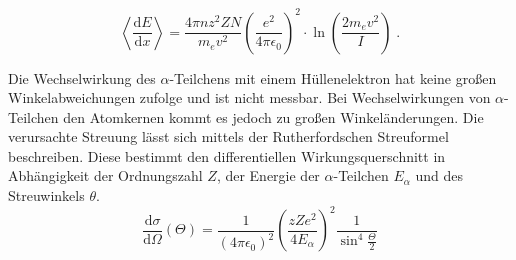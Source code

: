\begin{equation}
    \label{bethe}
    \left<\frac{\text{d}E}{\text{d}x}\right>=\frac{4\pi n z^2ZN }{m_e v^2}\left(\frac{e^2}{4 \pi \epsilon_0} \right)^2
    \cdot    \ln\left(\frac{2 m_e v^2}{I}\right)\;.
\end{equation}


Die Wechselwirkung des $\alpha$-Teilchens mit einem Hüllenelektron
hat keine großen Winkelabweichungen zufolge und ist nicht messbar. Bei
Wechselwirkungen von $\alpha$-Teilchen den Atomkernen kommt es jedoch zu großen
Winkeländerungen. Die verursachte Streuung lässt sich mittels der Rutherfordschen Streuformel beschreiben. Diese bestimmt den differentiellen Wirkungsquerschnitt in Abhängigkeit der Ordnungszahl $Z$, der Energie der $\alpha$-Teilchen $E_\alpha$ und des Streuwinkels $\theta$. 
\begin{equation}
    \label{wq}
    \frac{\text{d}\sigma}{\text{d}\Omega}(\Theta)
    =\frac{1}{(4\pi \epsilon_0)^2}
    \left( \frac{ z Z e^2}{4E_\alpha}\right)^2 \frac{1}{\sin ^4 \frac{ \Theta} {2}}
\end{equation}













